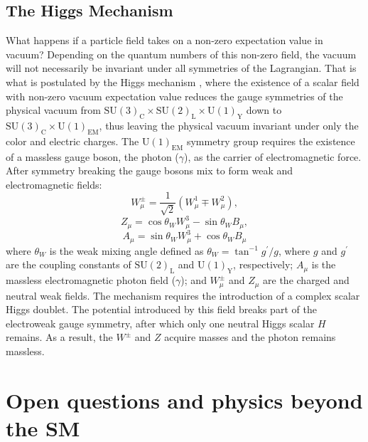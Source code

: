 \subsection{The Higgs Mechanism}

What happens if a particle field takes on a non-zero expectation value in vacuum? Depending on the
quantum numbers of this non-zero field, the vacuum will not necessarily be invariant under
all symmetries of the Lagrangian. That is what is postulated by the Higgs mechanism
\cite{Anderson:1963pc,Englert:1964et,Higgs:1964pj}, where
the existence of a scalar field with non-zero vacuum expectation value
reduces the gauge symmetries of the physical 
vacuum from $\text{SU}(3)_\text{C} \times \text{SU}(2)_\text{L} \times \text{U}(1)_\text{Y}$
down to $\text{SU}(3)_\text{C} \times \text{U}(1)_\text{EM}$, thus leaving the physical vacuum invariant under
only the color and electric charges. 
The $\text{U}(1)_\text{EM}$ symmetry group requires the existence of a massless
gauge boson, the photon ($\gamma$), as the carrier of electromagnetic force.
After symmetry breaking the gauge bosons mix to form weak and electromagnetic fields:
\begin{equation}
W_{\mu}^{\pm}=\frac{1}{\sqrt{2}}\left( W_{\mu}^1 \mp W_{\mu}^{2}\right),
\end{equation}
\begin{equation}
Z_{\mu}=\cos\theta_W W_{\mu}^3-\sin\theta_W B_{\mu},
\end{equation}
\begin{equation}
A_{\mu}=\sin\theta_W W_{\mu}^3+\cos\theta_W B_{\mu}
\end{equation}
where $\theta_W$ is the weak mixing angle defined as $\theta_W=\tan^{-1} g^{'}/g$, where $g$ 
and $g^{'}$ are the coupling constants of $\text{SU}(2)_\text{L}$ and $\text{U}(1)_\text{Y}$, respectively; $A_{\mu}$ is the 
massless electromagnetic photon field ($\gamma$); and $W_{\mu}^{\pm}$ and $Z_{\mu}$ are the charged 
and neutral weak fields. The mechanism requires the introduction of a complex
scalar Higgs doublet. The potential introduced by this field breaks part of the electroweak
 gauge symmetry,
after which only one neutral Higgs scalar $H$ remains. As a result, 
the $W^{\pm}$ and $Z$ acquire masses and the photon remains massless.

\section{Open questions and physics beyond the SM}

